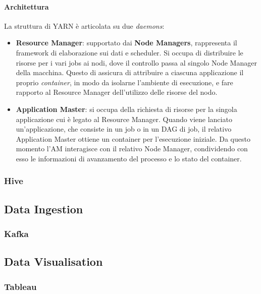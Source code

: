 \paragraph{Architettura}
La struttura di YARN è articolata su due \textit{daemons}:
\begin{itemize}
	\item \textbf{Resource Manager}: supportato dai \textbf{Node Managers}, rappresenta il framework di elaborazione sui dati e scheduler. Si occupa di distribuire le risorse per i vari jobs ai nodi, dove il controllo passa al singolo Node Manager della macchina. Questo di assicura di attribuire a ciascuna applicazione il proprio \textit{container}, in modo da isolarne l'ambiente di esecuzione, e fare rapporto al Resource Manager dell'utilizzo delle risorse del nodo.
	
	\item \textbf{Application Master}: si occupa della richiesta di risorse per la singola applicazione cui è legato al Resource Manager. Quando viene lanciato un'applicazione, che consiste in un job o in un DAG di job, il relativo Application Master ottiene un container per l'esecuzione iniziale. Da questo momento l'AM interagisce con il relativo Node Manager, condividendo con esso le informazioni di avanzamento del processo e lo stato del container.
\end{itemize}

\subsubsection{Hive}

\pagebreak

\subsection{Data Ingestion}

\subsubsection{Kafka}

\pagebreak

\subsection{Data Visualisation}

\subsubsection{Tableau}

